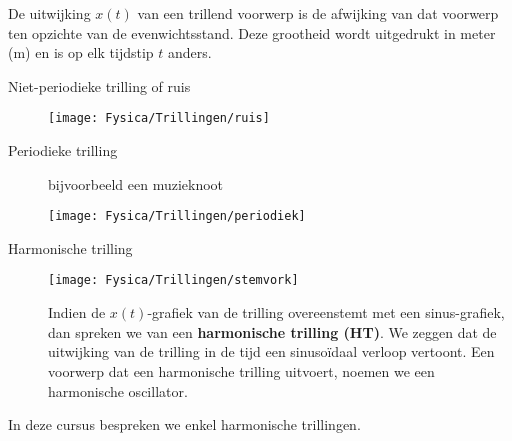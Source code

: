 \documentclass{ximera}
\begin{document}
De uitwijking $x(t)$ van een trillend voorwerp is de afwijking van dat voorwerp ten opzichte van de evenwichtsstand. Deze grootheid wordt uitgedrukt in meter (m) en is op elk tijdstip $t$ anders.

\begin{description}
    \item [Niet-periodieke trilling of ruis] 
            \begin{center}
        \texttt{[image: Fysica/Trillingen/ruis]}
            \end{center}

        \item [Periodieke trilling] bijvoorbeeld een muzieknoot 
            \begin{center}
        \texttt{[image: Fysica/Trillingen/periodiek]}
            \end{center}
        \item [Harmonische trilling] 
            \begin{center}
        \texttt{[image: Fysica/Trillingen/stemvork]}
            \end{center}
            Indien de $x\left(t\right)$-grafiek van de trilling overeenstemt met een sinus-grafiek, dan spreken we van een \textbf{harmonische trilling (HT)}. We zeggen dat de uitwijking van de trilling in de tijd een sinusoïdaal verloop vertoont. Een voorwerp dat een harmonische trilling uitvoert, noemen we een harmonische oscillator.
\end{description}

In deze cursus bespreken we enkel harmonische trillingen.
\end{document}
